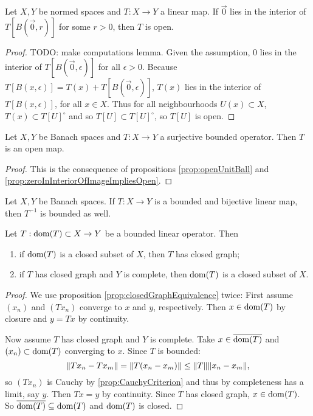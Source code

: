 \begin{proposition} \label{prop:zeroInInteriorOfImageImpliesOpen}
Let $X,Y$ be normed spaces and $T: X\to Y$ a linear map. If $\vec{0}$ lies in the interior of $T[B(\vec{0},r)]$ for some $r>0$, then $T$ is open.
\end{proposition}
\begin{proof}
TODO: make computations lemma.
Given the assumption, $0$ lies in the interior of $T[B(\vec{0},\epsilon)]$ for all $\epsilon>0$.
Because $T[B(x,\epsilon)] = T(x) + T[B(\vec{0},\epsilon)]$, $T(x)$ lies in the interior of $T[B(x,\epsilon)]$, for all $x\in X$.
Thus for all neighbourhoods $U(x)\subset X$, $T(x)\subset T[U]^\circ$ and so $T[U] \subset T[U]^\circ$, so $T[U]$ is open.
\end{proof}

\begin{theorem}
Let $X,Y$ be Banach spaces and $T:X\to Y$ a surjective bounded operator. Then $T$ is an open map.
\end{theorem}
\begin{proof}
This is the consequence of propositions \ref{prop:openUnitBall} and \ref{prop:zeroInInteriorOfImageImpliesOpen}.
\end{proof}
\begin{corollary} \label{corollary:boundedInverse}
Let $X,Y$ be Banach spaces. If $T:X\to Y$ is a bounded and bijective linear map, then $T^{-1}$ is bounded as well.
\end{corollary}


\begin{proposition}
Let $T: \operatorname{dom}(T)\subset X\to Y$ be a bounded linear operator. Then
\begin{enumerate}
\item if $\operatorname{dom}(T)$ is a closed subset of $X$, then $T$ has closed graph;
\item if $T$ has closed graph and $Y$ is complete, then $\operatorname{dom}(T)$ is a closed subset of $X$.
\end{enumerate}
\end{proposition}
\begin{proof}
We use proposition \ref{prop:closedGraphEquivalence} twice: First assume $(x_n)$ and $(Tx_n)$ converge to $x$ and $y$, respectively. Then $x\in\operatorname{dom}(T)$ by closure and $y = Tx$ by continuity.

Now assume $T$ has closed graph and $Y$ is complete. Take $x\in\overline{\operatorname{dom}(T)}$ and $(x_n)\subset \operatorname{dom}(T)$ converging to $x$. Since $T$ is bounded:
\[ \lVert Tx_n - Tx_m\rVert = \lVert T(x_n-x_m)\rVert \leq \lVert T\rVert\lVert x_n-x_m\rVert, \]
so $(Tx_n)$ is Cauchy by \ref{prop:CauchyCriterion} and thus by completeness has a limit, say $y$. Then $Tx=y$ by continuity. Since $T$ has closed graph, $x\in\operatorname{dom}(T)$. So $\overline{\operatorname{dom}(T)}\subseteq \operatorname{dom}(T)$ and $\operatorname{dom}(T)$ is closed. 
\end{proof}

